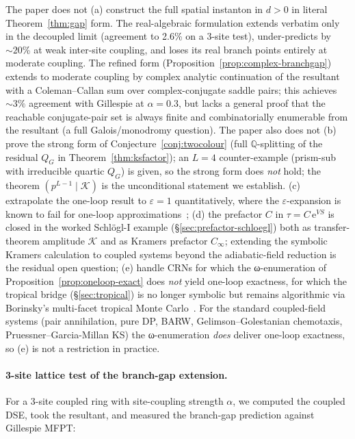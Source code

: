 \documentclass[11pt,a4paper]{article}
\newcommand{\ee}{\mathrm{e}}
\theoremstyle{plain}
\begin{document}
The paper does not (a) construct the full spatial instanton in
$d > 0$ in literal Theorem~\ref{thm:gap} form.  The real-algebraic
formulation extends verbatim only in the decoupled limit
(agreement to 2.6\% on a 3-site test), under-predicts by
$\sim 20$\% at weak inter-site coupling, and loses its real
branch points entirely at moderate coupling.  The refined form
(Proposition~\ref{prop:complex-branchgap}) extends to moderate
coupling by complex analytic continuation of the resultant with
a Coleman--Callan sum over complex-conjugate saddle pairs; this
achieves $\sim 3\%$ agreement with Gillespie at $\alpha = 0.3$,
but lacks a general proof that the reachable conjugate-pair set
is always finite and combinatorially enumerable from the
resultant (a full Galois/monodromy question).  The paper also
does not (b) prove the strong form of
Conjecture~\ref{conj:twocolour} (full $\mathbb{Q}$-splitting of
the residual $Q_G$ in Theorem~\ref{thm:ksfactor}); an $L = 4$
counter-example (prism-sub with irreducible quartic $Q_G$) is
given, so the strong form does \emph{not} hold; the theorem
$(p^{L-1} \mid \mathcal{K})$ is the unconditional statement we
establish.  (c) extrapolate the one-loop result to
$\varepsilon = 1$ quantitatively, where the $\varepsilon$-expansion
is known to fail for one-loop approximations~\cite{Tauber};
(d) the prefactor $C$ in $\tau = C\,\ee^{VS}$ is closed in the
worked Schl\"ogl-I example (\S\ref{sec:prefactor-schloegl}) both
as transfer-theorem amplitude $\mathcal K$ and as Kramers prefactor
$C_\infty$; extending the symbolic Kramers calculation to coupled
systems beyond the adiabatic-field reduction is the residual
open question; (e) handle CRNs for which
the ω-enumeration of Proposition~\ref{prop:oneloop-exact}
does \emph{not} yield one-loop exactness, for which the tropical
bridge (\S\ref{sec:tropical}) is no longer symbolic but remains
algorithmic via Borinsky's multi-facet tropical Monte
Carlo~\cite{Borinsky2020,Borinsky2025}.  For the standard
coupled-field systems (pair annihilation, pure DP, BARW,
Gelimson--Golestanian chemotaxis, Pruessner--Garcia-Millan KS)
the ω-enumeration \emph{does} deliver one-loop exactness, so
(e) is not a restriction in practice.

\paragraph{3-site lattice test of the branch-gap extension.}
For a 3-site coupled ring with site-coupling strength $\alpha$,
we computed the coupled DSE, took the resultant, and measured
the branch-gap prediction against Gillespie MFPT:
\end{document}
